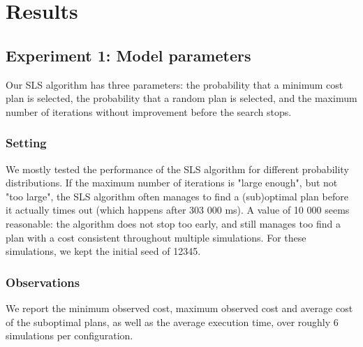\documentclass[10pt]{article}
\begin{document}
\section{Results}

\subsection{Experiment 1: Model parameters}
Our SLS algorithm has three parameters: the probability that a minimum cost plan is selected, the probability that a random plan is selected, and the maximum number of iterations without improvement before the search stops.

\subsubsection{Setting}
We mostly tested the performance of the SLS algorithm for different probability distributions. 
If the maximum number of iterations is "large enough", but not "too large", the SLS algorithm often manages to find a (sub)optimal plan before it actually times out (which happens after 303 000 ms). 
A value of 10 000 seems reasonable: the algorithm does not stop too early, and still manages too find a plan with a cost consistent throughout multiple simulations. 
For these simulations, we kept the initial seed of 12345.

\subsubsection{Observations}
We report the minimum observed cost, maximum observed cost and average cost of the suboptimal plans, as well as the average execution time, over roughly 6 simulations per configuration.\\
\end{document}
